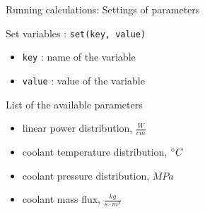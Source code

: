 \documentclass[11pt]{beamer}
\begin{document}
\begin{frame}{Running calculations: Settings of parameters}
  
  \footnotesize

  \begin{block}{Set variables : \texttt{set(key, value)}}
    \begin{itemize}
    \item \texttt{key} : name of the variable
    \item \texttt{value} : value of the variable    
    \end{itemize}
  \end{block}

  \begin{block}{List of the available parameters}
    \begin{itemize}
    \item linear power distribution, $\frac{W}{cm}$
    \item coolant temperature distribution, $\degree C$
    \item coolant pressure distribution, $MPa$
    \item coolant mass flux, $\frac{kg}{s \cdot m^2}$
    \end{itemize}
  \end{block}

\end{frame}
\end{document}

